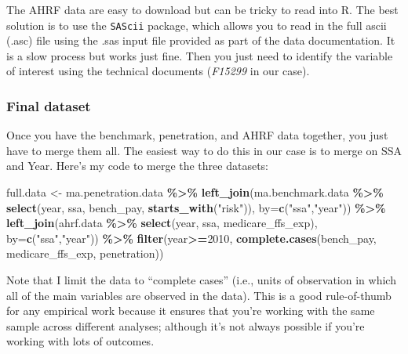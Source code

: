 \documentclass[
  12pt,
]{article}
\newenvironment{Shaded}{\begin{snugshade}}{\end{snugshade}}
\newcommand{\DataTypeTok}[1]{\textcolor[rgb]{0.13,0.29,0.53}{#1}}
\newcommand{\DecValTok}[1]{\textcolor[rgb]{0.00,0.00,0.81}{#1}}
\newcommand{\KeywordTok}[1]{\textcolor[rgb]{0.13,0.29,0.53}{\textbf{#1}}}
\newcommand{\NormalTok}[1]{#1}
\newcommand{\OperatorTok}[1]{\textcolor[rgb]{0.81,0.36,0.00}{\textbf{#1}}}
\newcommand{\StringTok}[1]{\textcolor[rgb]{0.31,0.60,0.02}{#1}}
\begin{document}
The AHRF data are easy to download but can be tricky to read into R. The best solution is to use the \texttt{SAScii} package, which allows you to read in the full ascii (.asc) file using the .sas input file provided as part of the data documentation. It is a slow process but works just fine. Then you just need to identify the variable of interest using the technical documents (\emph{F15299} in our case).

\hypertarget{final-dataset}{%
\subsubsection{Final dataset}\label{final-dataset}}

Once you have the benchmark, penetration, and AHRF data together, you just have to merge them all. The easiest way to do this in our case is to merge on SSA and Year. Here's my code to merge the three datasets:


\begin{Shaded}
\begin{Highlighting}[]
\NormalTok{full.data \textless{}{-}}\StringTok{ }\NormalTok{ma.penetration.data }\OperatorTok{\%\textgreater{}\%}\StringTok{ }
\StringTok{  }\KeywordTok{left\_join}\NormalTok{(ma.benchmark.data }\OperatorTok{\%\textgreater{}\%}\StringTok{ }\KeywordTok{select}\NormalTok{(year, ssa, bench\_pay, }\KeywordTok{starts\_with}\NormalTok{(}\StringTok{"risk"}\NormalTok{)),}
            \DataTypeTok{by=}\KeywordTok{c}\NormalTok{(}\StringTok{"ssa"}\NormalTok{,}\StringTok{"year"}\NormalTok{)) }\OperatorTok{\%\textgreater{}\%}
\StringTok{  }\KeywordTok{left\_join}\NormalTok{(ahrf.data }\OperatorTok{\%\textgreater{}\%}\StringTok{ }\KeywordTok{select}\NormalTok{(year, ssa, medicare\_ffs\_exp), }
            \DataTypeTok{by=}\KeywordTok{c}\NormalTok{(}\StringTok{"ssa"}\NormalTok{,}\StringTok{"year"}\NormalTok{)) }\OperatorTok{\%\textgreater{}\%}
\StringTok{  }\KeywordTok{filter}\NormalTok{(year}\OperatorTok{\textgreater{}=}\DecValTok{2010}\NormalTok{,}
  \KeywordTok{complete.cases}\NormalTok{(bench\_pay, medicare\_ffs\_exp, penetration))}
\end{Highlighting}
\end{Shaded}


Note that I limit the data to ``complete cases'' (i.e., units of observation in which all of the main variables are observed in the data). This is a good rule-of-thumb for any empirical work because it ensures that you're working with the same sample across different analyses; although it's not always possible if you're working with lots of outcomes.
\end{document}
